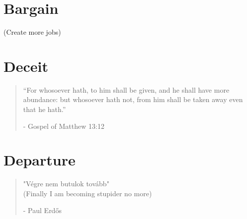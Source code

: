 \documentclass[smalldemyvopaper,11pt,twoside,onecolumn,openright,extrafontsizes]{memoir}
\begin{document}



\chapter{Bargain}


(Create more jobs)

\chapter{Deceit}


\vspace{-1.3cm}
\begin{localsize}{10}
	\begin{quote}
		“For whosoever hath, to him shall be given, and he shall have more abundance: but whosoever hath not, from him shall be taken away even that he hath.”
		\begin{flushright}- Gospel of Matthew 13:12 \end{flushright}
	\end{quote} 
\end{localsize}
\vspace{1cm}


\chapter{Departure}

\vspace{-1.3cm}
\begin{localsize}{10}
	\begin{quote}
		"Végre nem butulok tovább"\\
		
		(Finally I am becoming stupider no more) 
		\begin{flushright}- Paul Erdős \end{flushright}
	\end{quote} 
\end{localsize}
\vspace{1cm}
\end{document}
